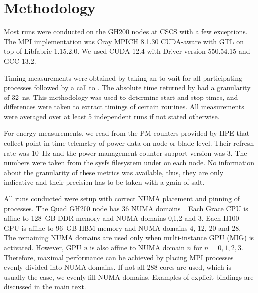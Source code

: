 \section{Methodology}
\label{sec:perf:methodology}

Most runs were conducted on the GH200 nodes at CSCS with a few exceptions.
The MPI implementation was Cray MPICH 8.1.30 CUDA-aware with GTL on top of Libfabric 1.15.2.0.
We used CUDA 12.4 with Driver version 550.54.15 and GCC 13.2.

Timing measurements were obtained by taking an  to wait for all participating processes followed by a call to .
The absolute time returned by  had a granularity of \SI{32}{\nano \second}.
This methodology was used to determine start and stop times, and differences were taken to extract timings of certain routines.
All measurements were averaged over at least \num{5} independent runs if not stated otherwise.

For energy measurements, we read from the PM counters provided by HPE that collect point-in-time telemetry of power data on node or blade level.
Their refresh rate was \SI{10}{\hertz} and the power management counter support version was \num{3}.
The numbers were taken from the sysfs filesystem under  on each node.
No information about the granularity of these metrics was available, thus, they are only indicative and their precision has to be taken with a grain of salt.

All runs conducted were setup with correct NUMA placement and pinning of processes.
The Quad GH200 node has \num{36} NUMA domains~\cite{fusco2024}.
Each Grace CPU is affine to \SI{128}{GB} DDR memory and NUMA domains \num{0},\num{1},\num{2} and \num{3}.
Each H100 GPU is affine to \SI{96}{GB} HBM memory and NUMA domains \num{4}, \num{12}, \num{20} and \num{28}.
The remaining NUMA domains are used only when multi-instance GPU (MIG) is activated.
However, GPU $n$ is also affine to NUMA domain $n$ for $n=0,1,2,3$.
Therefore, maximal performance can be achieved by placing MPI processes evenly divided into NUMA domains.
If not all \num{288} cores are used, which is usually the case, we evenly fill NUMA domains.
Examples of explicit bindings are discussed in the main text.

